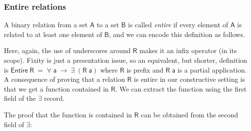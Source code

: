 \documentclass{CSML}
\numberwithin{theorem}{section}
\newcommand{\Conid}[1]{\mathit{#1}}
\newcommand{\Varid}[1]{\mathit{#1}}
\def\resethooks{\global\let\SaveRestoreHook\empty
  \global\let\ColumnHook\empty}
\let\hspost\empty
\renewcommand\Varid[1]{\ensuremath{\mathsf{#1}}}
\renewcommand\Conid[1]{\ensuremath{\mathsf{#1}}}
\begin{document}
\subsubsection*{Entire relations}
A binary relation from a set \ensuremath{\Conid{A}} to a set \ensuremath{\Conid{B}} is called \emph{entire} if
every element of \ensuremath{\Conid{A}} is related to at least one element of \ensuremath{\Conid{B}}, and we
can encode this definition as follows.
\resethooks
Here, again, the use of underscores around \ensuremath{\Conid{R}} makes it an infix
operator (in its scope).
Fixity is just a presentation issue, so an equivalent, but shorter,
definition is \ensuremath{\Conid{Entire}\;\Conid{R}\;\mathrel{=}\;\Varid{∀}\;\Varid{a}\;\to \;\Varid{∃}\;(\Conid{R}\;\Varid{a})} where \ensuremath{\Conid{R}} is prefix and \ensuremath{\Conid{R}\;\Varid{a}} is a partial application.
A consequence of proving that a relation \ensuremath{\Conid{R}} is entire in our constructive
setting is that we get a function contained in \ensuremath{\Conid{R}}.
We can extract the function using the first field of the \ensuremath{\Varid{∃}} record.
\resethooks
The proof that the function is contained in \ensuremath{\Conid{R}} can be obtained from
the second field of \ensuremath{\Varid{∃}}:
\end{document}
